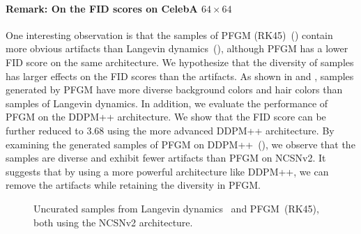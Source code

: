 \paragraph{Remark: On the FID scores on CelebA $64 \times 64$} {One interesting observation is that the samples of PFGM (RK45)~() contain more obvious artifacts than Langevin dynamics~(), although PFGM has a lower FID score on the same architecture. We hypothesize that the diversity of samples has larger effects on the FID scores than the artifacts. As shown in  and , samples generated by PFGM have more diverse background colors and hair colors than samples of Langevin dynamics. In addition, we evaluate the performance of PFGM on the DDPM++ architecture. We show that the FID score can be further reduced to $3.68$ using the more advanced DDPM++ architecture. By examining the generated samples of PFGM on DDPM++~(), we observe that the samples are diverse and exhibit fewer artifacts than PFGM on NCSNv2. It suggests that by using a more powerful architecture like DDPM++, we can remove the artifacts while retaining the diversity in PFGM.}




\begin{figure}[htbp]
    \centering
    \hfill
    \hfill
    \caption{Uncurated samples from Langevin dynamics~\cite{Song2019GenerativeMB} and PFGM~(RK45), both using the NCSNv2 architecture.}
    \label{fig:celeba_examine}
\end{figure}


